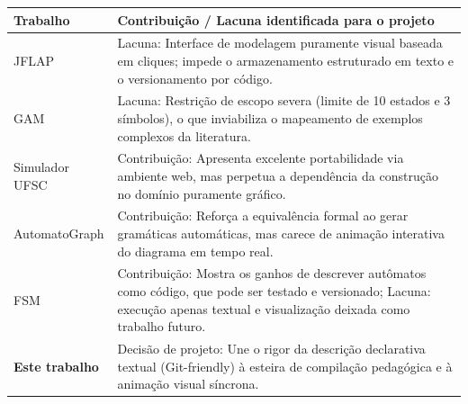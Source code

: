 \documentclass[
    12pt
    ,oneside
    ,a4paper
    ,chapter=TITLE
    ,section=TITLE
    ,sumario=abnt-6027-2012]{abntex2}
\begin{document}
\begin{quadro}[h]
    \centering
    \caption{CONTRIBUIÇÕES E LACUNAS IDENTIFICADAS NA LITERATURA}
    \label{quad:comparativo-qualitativo}
    \small
    \setlength{\tabcolsep}{5pt}

    \begin{tabularx}{\textwidth}{|>{\raggedright\arraybackslash}m{3.5cm}|>{\raggedright\arraybackslash}X|}
        \hline
        \textbf{Trabalho} & \textbf{Contribuição / Lacuna identificada para o projeto} \\
        \hline
        JFLAP
            & Lacuna: Interface de modelagem puramente visual baseada em cliques;
            impede o armazenamento estruturado em texto e o versionamento por código. \\
        \hline
        GAM
            & Lacuna: Restrição de escopo severa (limite de 10 estados e 3 símbolos),
            o que inviabiliza o mapeamento de exemplos complexos da literatura. \\
        \hline
        Simulador UFSC
            & Contribuição: Apresenta excelente portabilidade via ambiente web, mas
            perpetua a dependência da construção no domínio puramente gráfico. \\
        \hline
        AutomatoGraph
            & Contribuição: Reforça a equivalência formal ao gerar gramáticas
            automáticas, mas carece de animação interativa do diagrama em tempo real. \\
        \hline
        FSM
            & Contribuição: Mostra os ganhos de descrever autômatos como código, que pode ser
            testado e versionado; Lacuna: execução apenas textual e visualização deixada como
            trabalho futuro. \\
        \hline
        \textbf{Este trabalho}
            & Decisão de projeto: Une o rigor da descrição declarativa textual
            (Git-friendly) à esteira de compilação pedagógica e à animação visual síncrona. \\
        \hline
    \end{tabularx}
\end{quadro}

\end{document}
